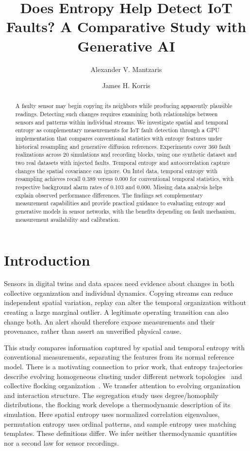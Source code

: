 \documentclass{llncs}
\title{Does Entropy Help Detect IoT Faults? A Comparative Study with Generative AI}
\author{Alexander V. Mantzaris\inst{1} \and James H. Korris\inst{2}}
\institute{School of Data, Mathematical, and Statistical Sciences\\
University of Central Florida\\
Orlando, FL, USA\\
\email{Alexander.Mantzaris@ucf.edu}
\and Creative Technologies Inc.\\
Hollywood, CA, USA\\
\email{james.korris@cretecinc.com}}
\begin{document}
\maketitle
\begin{abstract}
A faulty sensor may begin copying its neighbors while producing apparently plausible readings. Detecting such changes requires examining both relationships between sensors and patterns within individual streams. We investigate spatial and temporal entropy as complementary measurements for IoT fault detection through a GPU implementation that compares conventional statistics with entropy features under historical resampling and generative diffusion references. Experiments cover 360 fault realizations across 20 simulations and recording blocks, using one synthetic dataset and two real datasets with injected faults. Temporal entropy and autocorrelation capture changes the spatial covariance can ignore. On Intel data, temporal entropy with resampling achieves recall 0.389 versus 0.000 for conventional temporal statistics, with respective background alarm rates of 0.103 and 0.000. Missing data analysis helps explain observed performance differences. The findings set complementary measurement capabilities and provide practical guidance to evaluating entropy and generative models in sensor networks, with the benefits depending on fault mechanism, measurement availability and calibration.
\end{abstract}

\section{Introduction}
Sensors in digital twins and data spaces need evidence about changes in both
collective organization and individual dynamics. Copying streams can reduce
independent spatial variation, replay can alter the temporal organization without
creating a large marginal outlier. A legitimate operating transition can also
change both. An alert should therefore expose measurements and their provenance,
rather than assert an unverified physical cause.

This study compares information captured by spatial and temporal entropy with
conventional measurements, separating the features from its normal reference
model. There is a motivating connection to prior work, that entropy
trajectories describe evolving homogeneous clusting under different network
topologies~\cite{mantzaris2024} and collective flocking
organization~\cite{mantzaris2025}. We transfer attention to evolving organization
and interaction structure. The segregation study uses degree/homophily
distributions, the flocking work develops a thermodynamic description of its
simulation. Here spatial entropy uses normalized correlation eigenvalues,
permutation entropy uses ordinal patterns, and sample entropy uses matching
templates. These definitions differ. We infer neither thermodynamic quantities
nor a second law for sensor recordings.
\end{document}
